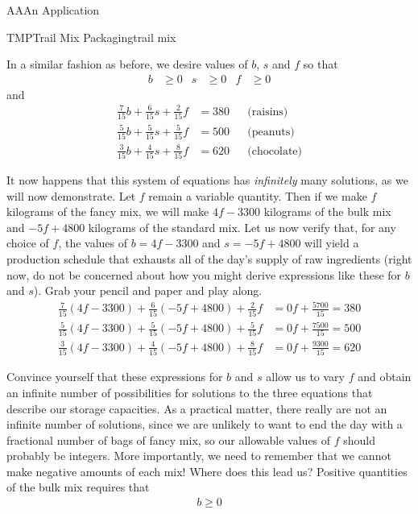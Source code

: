 \begin{subsect}{AA}{An Application}
\begin{example}{TMP}{Trail Mix Packaging}{trail mix}
%
\begin{para}In a similar fashion as before, we desire values of $b$, $s$ and $f$ so that
%
\begin{align*}
b&\geq 0  &  s&\geq 0  &  f&\geq 0
\end{align*}
%
and
\begin{align*}
\frac{7}{15}b+\frac{6}{15}s+\frac{2}{15}f&=380&&\text{(raisins)}\\
\frac{5}{15}b+\frac{5}{15}s+\frac{5}{15}f&=500&&\text{(peanuts)}\\
\frac{3}{15}b+\frac{4}{15}s+\frac{8}{15}f&=620&&\text{(chocolate)}
\end{align*}
\end{para}
%
\begin{para}It now happens that this system of equations has {\em infinitely} many solutions, as we will now demonstrate.  Let $f$ remain a variable quantity.  Then if we make $f$ kilograms of the fancy mix, we will make $4f-3300$ kilograms of the bulk mix and $-5f+4800$ kilograms of the standard mix.  Let us now verify that, for any choice of $f$, the values of $b=4f-3300$ and $s=-5f+4800$ will yield a production schedule that exhausts all of the day's supply of raw ingredients (right now, do not be concerned about how you might derive expressions like these for $b$ and $s$).  Grab your pencil and paper and play along.
%
\begin{align*}
\frac{7}{15}(4f-3300)+\frac{6}{15}(-5f+4800)+\frac{2}{15}f&=0f+\frac{5700}{15}=380\\
\frac{5}{15}(4f-3300)+\frac{5}{15}(-5f+4800)+\frac{5}{15}f&=0f+\frac{7500}{15}=500\\
\frac{3}{15}(4f-3300)+\frac{4}{15}(-5f+4800)+\frac{8}{15}f&=0f+\frac{9300}{15}=620
\end{align*}\end{para}
%
\begin{para}Convince yourself that these expressions for $b$ and $s$ allow us to vary $f$ and obtain an infinite number of possibilities for solutions to the three equations that describe our storage capacities.  As a practical matter, there really are not an infinite number of solutions, since we are unlikely to want to end the day with a fractional number of bags of fancy mix, so our allowable values of $f$ should probably be integers.  More importantly, we need to remember that we cannot make negative amounts of each mix!  Where does this lead us?   Positive quantities of the bulk mix requires that
%
\begin{align*}
b\geq 0

\end{align*}
\end{para}
\end{example}
\end{subsect}
